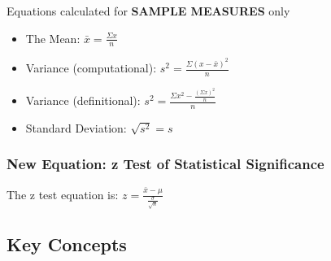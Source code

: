 \documentclass[]{article}
\begin{document}
Equations calculated for \textbf{SAMPLE MEASURES} only

\begin{itemize}
\itemsep1pt\parskip0pt
\item
  The Mean: $\bar{x} = \frac{\Sigma x}{n}$
\item
  Variance (computational): $s^2 = \frac{\Sigma (x - \bar{x})^2}{n}$
\item
  Variance (definitional):
  $s^2 = \frac{\Sigma x^2 - \frac{(\Sigma x)^2}{n}}{n}$
\item
  Standard Deviation: $\sqrt{s^2} = s$
\end{itemize}

\subsubsection{New Equation: z Test of Statistical
Significance}\label{new-equation-z-test-of-statistical-significance}

The z test equation is:
$z = \frac{\bar{x}-\mu}{\frac{\sigma}{\sqrt{n}}}$

\subsection{Key Concepts}\label{key-concepts}
\end{document}
